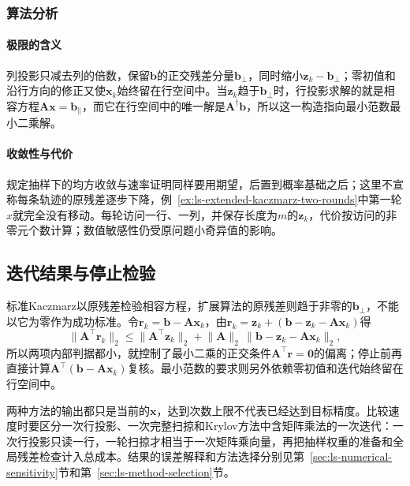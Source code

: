 \subsubsection{算法分析}

\paragraph{极限的含义}
列投影只减去列的倍数，保留$\bm b$的正交残差分量$\bm b_\perp$，同时缩小$\bm z_k-\bm b_\perp$；零初值和沿行方向的修正又使$\bm x_k$始终留在行空间中。当$\bm z_k$趋于$\bm b_\perp$时，行投影求解的就是相容方程$\bm A\bm x=\bm b_\parallel$，而它在行空间中的唯一解是$\bm A^\dagger\bm b$，所以这一构造指向最小范数最小二乘解。

\paragraph{收敛性与代价}
规定抽样下的均方收敛与速率证明同样要用期望，后置到概率基础之后；这里不宣称每条轨迹的原残差逐步下降，例~\ref{ex:ls-extended-kaczmarz-two-rounds}中第一轮$x$就完全没有移动。每轮访问一行、一列，并保存长度为$m$的$\bm z_k$，代价按访问的非零元个数计算；数值敏感性仍受原问题小奇异值的影响。

\subsection{迭代结果与停止检验}
\label{sec:ls-row-projection-stopping}

标准Kaczmarz以原残差检验相容方程，扩展算法的原残差则趋于非零的$\bm b_\perp$，不能以它为零作为成功标准。令$\bm r_k=\bm b-\bm A\bm x_k$，由$\bm r_k=\bm z_k+(\bm b-\bm z_k-\bm A\bm x_k)$得
\[
\lVert\bm A^\top\bm r_k\rVert_2\leq\lVert\bm A^\top\bm z_k\rVert_2+\lVert\bm A\rVert_2\,\lVert\bm b-\bm z_k-\bm A\bm x_k\rVert_2 ,
\]
所以两项内部判据都小，就控制了最小二乘的正交条件$\bm A^\top\bm r=\bm 0$的偏离；停止前再直接计算$\bm A^\top(\bm b-\bm A\bm x_k)$复核。最小范数的要求则另外依赖零初值和迭代始终留在行空间中。

两种方法的输出都只是当前的$\bm x$，达到次数上限不代表已经达到目标精度。比较速度时要区分一次行投影、一次完整扫掠和Krylov方法中含矩阵乘法的一次迭代：一次行投影只读一行，一轮扫掠才相当于一次矩阵乘向量，再把抽样权重的准备和全局残差检查计入总成本。结果的误差解释和方法选择分别见第~\ref{sec:ls-numerical-sensitivity}节和第~\ref{sec:ls-method-selection}节。

